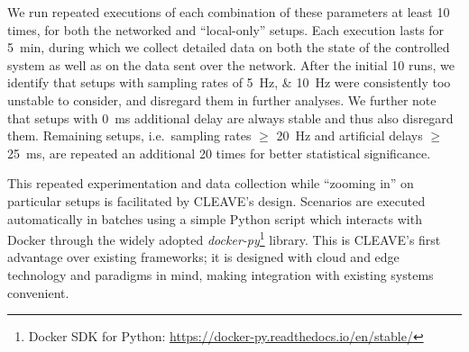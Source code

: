 We run repeated executions of each combination of these parameters at least \num{10} times, for both the networked and ``local-only'' setups.
Each execution lasts for \SI{5}{\minute}, during which we collect detailed data on both the state of the controlled system as well as on the data sent over the network.
After the initial \num{10} runs, we identify that setups with sampling rates of \SIlist{5;10}{\hertz} were consistently too unstable to consider, and disregard them in further analyses.
We further note that setups with \SI{0}{\milli\second} additional delay are always stable and thus also disregard them.
Remaining setups, i.e.\ sampling rates \( \geq \) \SI{20}{\hertz} and artificial delays \( \geq \) \SI{25}{\milli\second}, are repeated an additional \num{20} times for better statistical significance.

This repeated experimentation and data collection while ``zooming in'' on particular setups is facilitated by \ac{CLEAVE}'s design.
Scenarios are executed automatically in batches using a simple Python script which interacts with Docker through the widely adopted \emph{docker-py}\footnote{Docker SDK for Python: \url{https://docker-py.readthedocs.io/en/stable/}} library.
This is \ac{CLEAVE}'s first advantage over existing frameworks; it is designed with cloud and edge technology and paradigms in mind, making integration with existing systems convenient.


